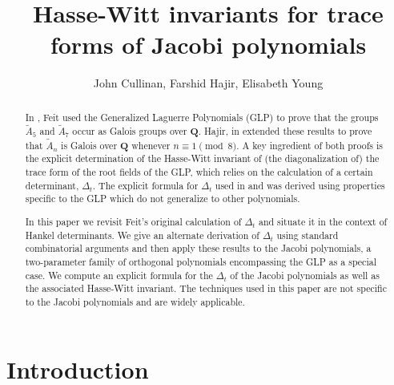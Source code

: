 \documentclass{amsart}
\newcommand{\Q}{\mathbf{Q}}
\theoremstyle{plain}
\theoremstyle{remark}
\begin{document}
\title{Hasse-Witt invariants for trace forms of Jacobi polynomials}

\author{John Cullinan, Farshid Hajir, Elisabeth Young}

\address{Department of Mathematics, Bard College, Annandale-On-Hudson, NY 12504, USA}

\address{Department of Mathematics and Statistics, University of Massachusetts Amherst, Amherst, MA 01003, USA}

\address{Department of Mathematics, Bard College, Annandale-On-Hudson, NY 12504, USA}


\begin{abstract}
In \cite{feit}, Feit used the Generalized Laguerre Polynomials (GLP) to prove that the groups $\widetilde{A}_{5}$ and $\widetilde{A}_{7}$ occur as Galois groups over $\Q$.  Hajir, in \cite{hajir} extended these results to prove that $\widetilde{A}_{n}$ is Galois over $\Q$ whenever $n \equiv 1 \pmod{8}$.  A key ingredient of both proofs is the explicit determination of the Hasse-Witt invariant of (the diagonalization of) the trace form of the root fields of the GLP, which relies on the calculation of a certain determinant, $\Delta_t$.  The explicit formula for $\Delta_t$ used in \cite{feit} and \cite{hajir} was derived using properties specific to the GLP which do not generalize to other polynomials.

In this paper we revisit Feit's original calculation of $\Delta_t$ and situate it in the context of Hankel determinants.  We give an alternate derivation of $\Delta_t$ using standard combinatorial arguments and then apply these results to the Jacobi polynomials, a two-parameter family of orthogonal polynomials encompassing the GLP as a special case.  We compute an explicit formula for the $\Delta_t$ of the Jacobi polynomials as well as the associated Hasse-Witt invariant.  The techniques used in this paper are not specific to the Jacobi polynomials and are widely applicable. 
\end{abstract}

\maketitle

\section{Introduction} \label{Introduction}
\end{document}
